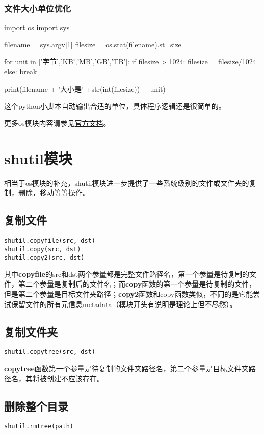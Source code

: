\documentclass[12pt,oneside]{book}
\begin{document}
\begin{common-format}
\subsection{文件大小单位优化}
\begin{tcbpython}[]
import os
import sys

filename = sys.argv[1]
filesize = os.stat(filename).st_size

for unit in ['字节','KB','MB','GB','TB']:
    if filesize > 1024:
        filesize = filesize/1024
    else:
        break

print(filename + '大小是' +str(int(filesize)) + unit)
\end{tcbpython}
这个python小脚本自动输出合适的单位，具体程序逻辑还是很简单的。


\begin{large}
更多os模块内容请参见\href{https://docs.python.org/3.4/library/os.html}{官方文档}。
\end{large}

\chapter{shutil模块}
相当于os模块的补充，shutil模块进一步提供了一些系统级别的文件或文件夹的复制，删除，移动等等操作。

\section{复制文件}
\begin{Verbatim}
shutil.copyfile(src, dst)
shutil.copy(src, dst)
shutil.copy2(src, dst)
\end{Verbatim}
其中\textbf{copyfile}的src和dst两个参量都是完整文件路径名，第一个参量是待复制的文件，第二个参量是复制后的文件名；而\textbf{copy}函数的第一个参量是待复制的文件，但是第二个参量是目标文件夹路径；\textbf{copy2}函数和copy函数类似，不同的是它能尝试保留文件的所有元信息metadata（模块开头有说明是理论上但不尽然）。

\section{复制文件夹}
\begin{Verbatim}
shutil.copytree(src, dst)
\end{Verbatim}

\textbf{copytree}函数第一个参量是待复制的文件夹路径名，第二个参量是目标文件夹路径名，其将被创建不应该存在。

\section{删除整个目录}
\begin{Verbatim}
shutil.rmtree(path)
\end{Verbatim}


\end{common-format}
\end{document}
